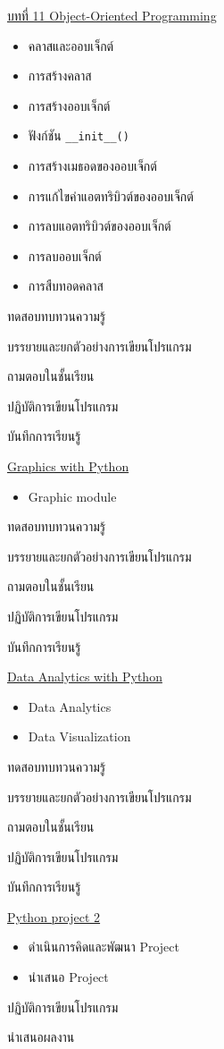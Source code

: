 {
\underline{บทที่ 11 Object-Oriented Programming}
\begin{itemize}
\item คลาสและออบเจ็กต์
\item การสร้างคลาส
\item การสร้างออบเจ็กต์
\item ฟังก์ชัน \texttt{\_\_init\_\_()}
\item การสร้างเมธอดของออบเจ็กต์
\item การแก้ไขค่าแอตทริบิวต์ของออบเจ็กต์
\item การลบแอตทริบิวต์ของออบเจ็กต์
\item การลบออบเจ็กต์
\item การสืบทอดคลาส
\end{itemize}
}
{
\item ทดสอบทบทวนความรู้
\item  บรรยายและยกตัวอย่างการเขียนโปรแกรม
\item  ถามตอบในชั้นเรียน
\item  ปฏิบัติการเขียนโปรแกรม
\item  บันทึกการเรียนรู้
}
{
\underline{Graphics with Python}
\begin{itemize}
\item Graphic module
\end{itemize}
}
{
\item ทดสอบทบทวนความรู้
\item  บรรยายและยกตัวอย่างการเขียนโปรแกรม
\item  ถามตอบในชั้นเรียน
\item  ปฏิบัติการเขียนโปรแกรม
\item  บันทึกการเรียนรู้
}
{
\underline{Data Analytics with Python}
\begin{itemize}
\item Data Analytics
\item Data Visualization
\end{itemize}
}
{
\item ทดสอบทบทวนความรู้
\item  บรรยายและยกตัวอย่างการเขียนโปรแกรม
\item  ถามตอบในชั้นเรียน
\item  ปฏิบัติการเขียนโปรแกรม
\item  บันทึกการเรียนรู้
}
{
\underline{Python project 2}
\begin{itemize}
\item ดำเนินการคิดและพัฒนา Project
\item นำเสนอ Project
\end{itemize}
}
{
\item  ปฏิบัติการเขียนโปรแกรม
\item  นำเสนอผลงาน
}


